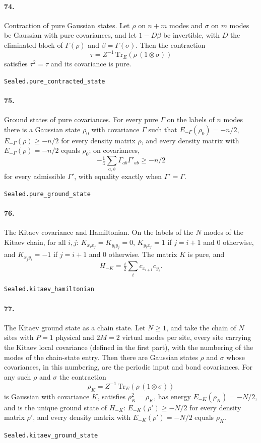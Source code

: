 \documentclass[11pt]{article}
\begin{document}
\paragraph{74.} Contraction of pure Gaussian states. Let $\rho$ on $n + m$ modes and $\sigma$ on $m$ modes be Gaussian with pure covariances, and let $1 - D\beta$ be invertible, with $D$ the eliminated block of $\Gamma(\rho)$ and $\beta = \Gamma(\sigma)$. Then the contraction \[\tau = Z^{-1}\,\mathrm{Tr}_E(\rho\,(1 \otimes \sigma))\] satisfies $\tau^2 = \tau$ and its covariance is pure.\par{\footnotesize\texttt{Sealed.pure\_contracted\_state}}

\paragraph{75.} Ground states of pure covariances. For every pure $\Gamma$ on the labels of $n$ modes there is a Gaussian state $\rho_0$ with covariance $\Gamma$ such that $E_{-\Gamma}(\rho_0) = -n/2$, $E_{-\Gamma}(\rho) \ge -n/2$ for every density matrix $\rho$, and every density matrix with $E_{-\Gamma}(\rho) = -n/2$ equals $\rho_0$; on covariances, \[-\tfrac14\sum_{a,b}\Gamma_{ab}\Gamma'_{ab} \ge -n/2\] for every admissible $\Gamma'$, with equality exactly when $\Gamma' = \Gamma$.\par{\footnotesize\texttt{Sealed.pure\_ground\_state}}

\paragraph{76.} The Kitaev covariance and Hamiltonian. On the labels of the $N$ modes of the Kitaev chain, for all $i, j$: $K_{x_i x_j} = K_{y_i y_j} = 0$, $K_{y_i x_j} = 1$ if $j = i + 1$ and $0$ otherwise, and $K_{x_j y_i} = -1$ if $j = i + 1$ and $0$ otherwise. The matrix $K$ is pure, and \[H_{-K} = \tfrac i2 \sum_i c_{x_{i+1}} c_{y_i}.\]\par{\footnotesize\texttt{Sealed.kitaev\_hamiltonian}}

\paragraph{77.} The Kitaev ground state as a chain state. Let $N \ge 1$, and take the chain of $N$ sites with $P = 1$ physical and $2M = 2$ virtual modes per site, every site carrying the Kitaev local covariance (defined in the first part), with the numbering of the modes of the chain-state entry. Then there are Gaussian states $\rho$ and $\sigma$ whose covariances, in this numbering, are the periodic input and bond covariances. For any such $\rho$ and $\sigma$ the contraction \[\rho_K = Z^{-1}\,\mathrm{Tr}_E(\rho\,(1 \otimes \sigma))\] is Gaussian with covariance $K$, satisfies $\rho_K^2 = \rho_K$, has energy $E_{-K}(\rho_K) = -N/2$, and is the unique ground state of $H_{-K}$: $E_{-K}(\rho') \ge -N/2$ for every density matrix $\rho'$, and every density matrix with $E_{-K}(\rho') = -N/2$ equals $\rho_K$.\par{\footnotesize\texttt{Sealed.kitaev\_ground\_state}}
\end{document}
